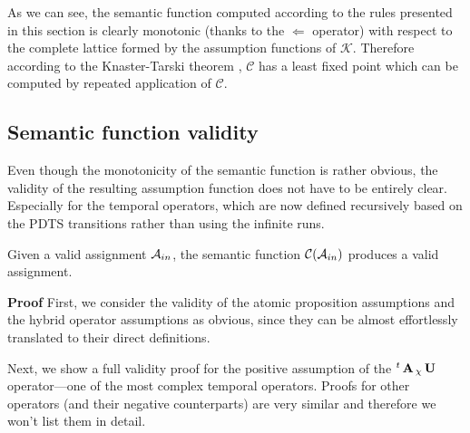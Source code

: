 As we can see, the semantic function computed according to the rules presented in this section is clearly monotonic (thanks to the $\Leftarrow$ operator) with respect to the complete lattice formed by the assumption functions of $\mathcal{K}$. Therefore according to the Knaster-Tarski theorem \cite{tarski1955}, $\mathcal{C}$ has a least fixed point which can be computed by repeated application of $\mathcal{C}$.

\subsection{Semantic function validity}

Even though the monotonicity of the semantic function is rather obvious, the validity of the resulting assumption function does not have to be entirely clear. Especially for the temporal operators, which are now defined recursively based on the \ac{PDTS} transitions rather than using the infinite runs.

\begin{lemma}
	\label{lemma:semantic}
	Given a valid assignment $\mathcal{A}_{in}$, the semantic function $\mathcal{C}(\mathcal{A}_{in})$ produces a valid assignment.
\end{lemma}

\textbf{Proof} First, we consider the validity of the atomic proposition assumptions and the hybrid operator assumptions as obvious, since they can be almost effortlessly translated to their direct definitions.

Next, we show a full validity proof for the positive assumption of the ${}^{t}\operatorname{\mathbf{A}}{}_{\chi}\operatorname{\mathbf{U}}$ operator—one of the most complex temporal operators. Proofs for other operators (and their negative counterparts) are very similar and therefore we won't list them in detail.

